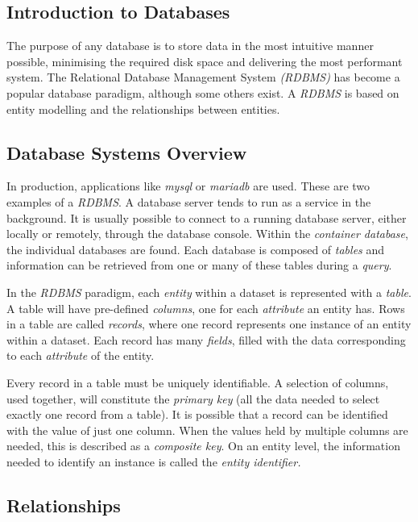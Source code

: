 \documentclass[9pt]{article}
\begin{document}
\subsection{Introduction to Databases}
\label{sec:org548115c}

The purpose of any database is to store data in the most intuitive manner possible, minimising the required disk space and delivering the most performant system. The Relational Database Management System \emph{(RDBMS)} has become a popular database paradigm, although some others exist. A \emph{RDBMS} is based on entity modelling and the relationships between entities.

\subsection{Database Systems Overview}
\label{sec:orgffc74b6}

In production, applications like \emph{mysql} or \emph{mariadb} are used. These are two examples of a \emph{RDBMS}. A database server tends to run as a service in the background. It is usually possible to connect to a running database server, either locally or remotely, through the database console. Within the \emph{container database}, the individual databases are found. Each database is composed of \emph{tables} and information can be retrieved from one or many of these tables during a \emph{query}.

In the \emph{RDBMS} paradigm, each \emph{entity} within a dataset is represented with a \emph{table}. A table will have pre-defined \emph{columns}, one for each \emph{attribute} an entity has. Rows in a table are called \emph{records}, where one record represents one instance of an entity within a dataset. Each record has many \emph{fields}, filled with the data corresponding to each \emph{attribute} of the entity.

Every record in a table must be uniquely identifiable. A selection of columns, used together, will constitute the \emph{primary key} (all the data needed to select exactly one record from a table). It is possible that a record can be identified with the value of just one column. When the values held by multiple columns are needed, this is described as a \emph{composite key}. On an entity level, the information needed to identify an instance is called the \emph{entity identifier.}

\subsection{Relationships}
\label{sec:orge366a67}
\end{document}
